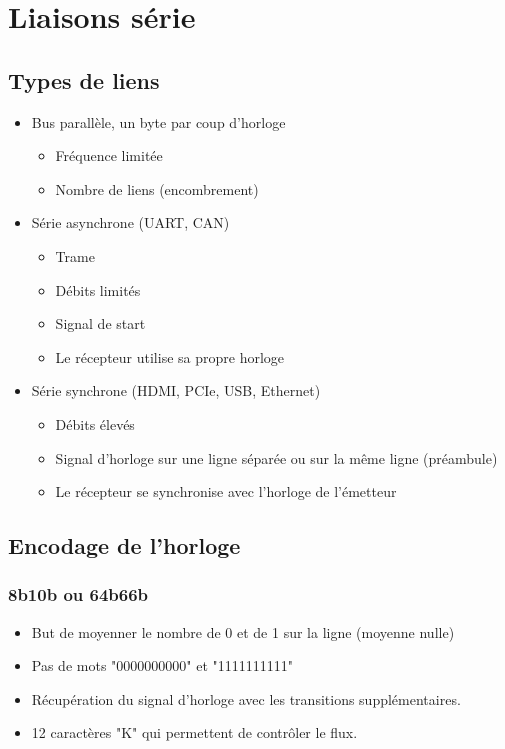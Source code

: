 \documentclass[resume]{subfiles}
\begin{document}
\section{Liaisons série}
\subsection{Types de liens}
\begin{itemize}
\item Bus parallèle, un byte par coup d'horloge
\begin{itemize}
\item Fréquence limitée
\item Nombre de liens (encombrement)
\end{itemize}
\item Série asynchrone (UART, CAN)
\begin{itemize}
\item Trame
\item Débits limités
\item Signal de start
\item Le récepteur utilise sa propre horloge
\end{itemize}
\item Série synchrone (HDMI, PCIe, USB, Ethernet)
\begin{itemize}
\item Débits élevés
\item Signal d'horloge sur une ligne séparée ou sur la même ligne (préambule)
\item Le récepteur se synchronise avec l'horloge de l'émetteur
\end{itemize}
\end{itemize}
\subsection{Encodage de l'horloge}
\subsubsection{8b10b ou 64b66b}
\begin{itemize}
\item But de moyenner le nombre de 0 et de 1 sur la ligne (moyenne nulle)
\item Pas de mots "0000000000" et "1111111111"
\item Récupération du signal d'horloge avec les transitions supplémentaires.
\item 12 caractères "K" qui permettent de contrôler le flux.
\end{itemize}
\end{document}
